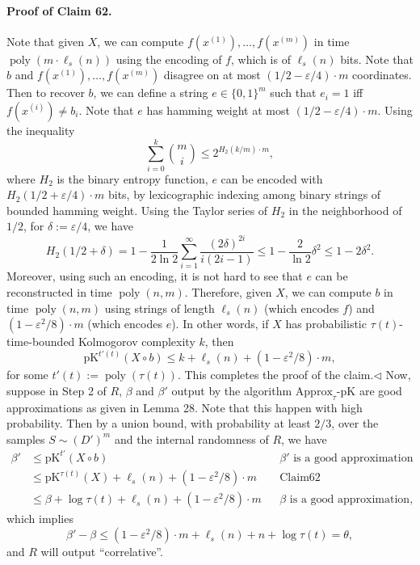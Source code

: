 \documentclass[10pt,a4paper]{article}
\begin{document}
\paragraph{Proof of Claim 62.} Note that given $X$, we can compute $f(x^{(1)}),\ldots,f(x^{(m)})$ in time $\operatorname{poly}(m\cdot\ell_s(n))$ using the encoding of $f$, which is of $\ell_s(n)$ bits. Note that $b$ and $f(x^{(1)}),\ldots,f(x^{(m)})$ disagree on at most $(1/2-\varepsilon/4)\cdot m$ coordinates. Then to recover $b$, we can define a string $e\in\{0,1\}^m$ such that $e_i=1$ iff $f(x^{(i)})\neq b_i$. Note that $e$ has hamming weight at most $(1/2-\varepsilon/4)\cdot m$. Using the inequality
\[\sum_{i=0}^k\binom mi\leq2^{H_2(k/m)\cdot m},\]
where $H_2$ is the binary entropy function, $e$ can be encoded with $H_2(1/2+\varepsilon/4)\cdot m$ bits, by lexicographic indexing among binary strings of bounded hamming weight. Using the Taylor series of $H_2$ in the neighborhood of $1/2$, for $\delta:=\varepsilon/4$, we have
\[H_2(1/2+\delta)=1-\frac1{2\ln2}\sum_{i=1}^\infty\frac{(2\delta)^{2i}}{i(2i-1)}\leq1-\frac2{\ln2}\delta^2\leq1-2\delta^2.\]
Moreover, using such an encoding, it is not hard to see that $e$ can be reconstructed in time $\operatorname{poly}(n,m)$. Therefore, given $X$, we can compute $b$ in time $\operatorname{poly}(n,m)$ using strings of length $\ell_s(n)$ (which encodes $f$) and $(1-\varepsilon^2/8)\cdot m$ (which encodes $e$). In other words, if $X$ has probabilistic $\tau(t)$-time-bounded Kolmogorov complexity $k$, then
\[\mathrm{pK}^{t'(t)}(X\circ b)\leq k+\ell_s(n)+(1-\varepsilon^2/8)\cdot m,\]
for some $t'(t):=\operatorname{poly}(\tau(t))$. This completes the proof of the claim.\hfill$\triangleleft$
Now, suppose in Step 2 of $R$, $\beta$ and $\beta'$ output by the algorithm $\mathrm{Approx}_\tau\text{-}\mathrm{pK}$ are good approximations as given in Lemma 28. Note that this happen with high probability. Then by a union bound, with probability at least $2/3$, over the samples $S\sim(D')^m$ and the internal randomness of $R$, we have
\begin{align*}
\beta'&\leq\mathrm{pK}^{t'}(X\circ b)&&\beta'\text{ is a good approximation}\\
&\leq\mathrm{pK}^{\tau(t)}(X)+\ell_s(n)+(1-\varepsilon^2/8)\cdot m&&\text{Claim62}\\
&\leq\beta+\log\tau(t)+\ell_s(n)+(1-\varepsilon^2/8)\cdot m&&\beta\text{ is a good approximation},
\end{align*}
which implies
\[\beta'-\beta\leq(1-\varepsilon^2/8)\cdot m+\ell_s(n)+n+\log\tau(t)=\theta,\]
and $R$ will output ``correlative''.
\end{document}
